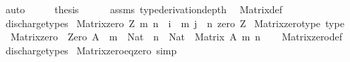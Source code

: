 \begin{isabellebody}
\ auto\isanewline
\ \ \isamarkupfalse%
\ \isamarkupfalse%
\ {\isacharquery}{\kern0pt}thesis\isanewline
\ \ \ \ \isamarkupfalse%
\ assms\ {\isacharbrackleft}{\kern0pt}{\isacharbrackleft}{\kern0pt}type{\isacharunderscore}{\kern0pt}derivation{\isacharunderscore}{\kern0pt}depth{\isacharequal}{\kern0pt}{}{\isacharbrackright}{\kern0pt}{\isacharbrackright}{\kern0pt}\ \isamarkupfalse%
\ Matrix{\isacharunderscore}{\kern0pt}def\isanewline
\ \ \ \ \isamarkupfalse%
\ discharge{\isacharunderscore}{\kern0pt}types\isanewline
{}\isamarkupfalse%
%
\endisatagproof
{\isafoldproof}%
%
\isadelimproof
%
\endisadelimproof
%
\isadelimdocument
%
\endisadelimdocument
%
\isatagdocument
%
\isamarkuptrue%
%
\endisatagdocument
{\isafolddocument}%
%
\isadelimdocument
%
\endisadelimdocument
{}\isamarkupfalse%
\ {\isachardoublequoteopen}Matrix{\isacharunderscore}{\kern0pt}zero\ Z\ m\ n\ {\isasymequiv}\ {\isasymlambda}i\ {\isasymin}\ {\isacharbrackleft}{\kern0pt}{}{\isacharcomma}{\kern0pt}{\isasymdots}{\isacharcomma}{\kern0pt}m{\isacharbrackleft}{\kern0pt}{\isachardot}{\kern0pt}\ {\isasymlambda}j\ {\isasymin}\ {\isacharbrackleft}{\kern0pt}{}{\isacharcomma}{\kern0pt}{\isasymdots}{\isacharcomma}{\kern0pt}n{\isacharbrackleft}{\kern0pt}{\isachardot}{\kern0pt}\ zero\ Z{\isachardoublequoteclose}\isanewline
\isanewline
{}\isamarkupfalse%
\ Matrix{\isacharunderscore}{\kern0pt}zero{\isacharunderscore}{\kern0pt}type\ {\isacharbrackleft}{\kern0pt}type{\isacharbrackright}{\kern0pt}{\isacharcolon}{\kern0pt}\isanewline
\ \ {\isachardoublequoteopen}Matrix{\isacharunderscore}{\kern0pt}zero\ {\isacharcolon}{\kern0pt}\ Zero\ A\ {\isasymRightarrow}\ {\isacharparenleft}{\kern0pt}m\ {\isacharcolon}{\kern0pt}\ Nat{\isacharparenright}{\kern0pt}\ {\isasymRightarrow}\ {\isacharparenleft}{\kern0pt}n\ {\isacharcolon}{\kern0pt}\ Nat{\isacharparenright}{\kern0pt}\ {\isasymRightarrow}\ Matrix\ A\ m\ n{\isachardoublequoteclose}\isanewline
%
\isadelimproof
\ \ %
\endisadelimproof
%
\isatagproof
{}\isamarkupfalse%
\ Matrix{\isacharunderscore}{\kern0pt}zero{\isacharunderscore}{\kern0pt}def\ \isamarkupfalse%
\ discharge{\isacharunderscore}{\kern0pt}types%
\endisatagproof
{\isafoldproof}%
%
\isadelimproof
\isanewline
%
\endisadelimproof
\isanewline
{}\isamarkupfalse%
\ Matrix{\isacharunderscore}{\kern0pt}zero{\isacharunderscore}{\kern0pt}eq{\isacharunderscore}{\kern0pt}zero\ {\isacharbrackleft}{\kern0pt}simp{\isacharbrackright}{\kern0pt}{\isacharcolon}{\kern0pt}\isanewline

\end{isabellebody}
